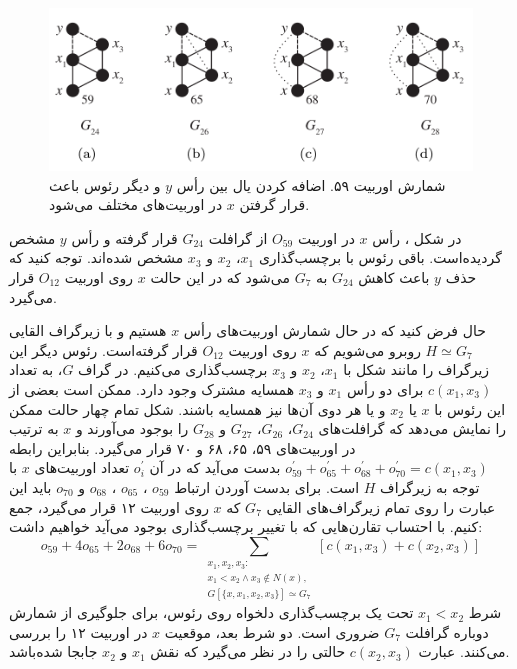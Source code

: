 \begin{figure}[t]
\centering
\includegraphics[scale=0.3]{./o59-orbit-relation.png}
\caption{شمارش اوربیت ۵۹. اضافه کردن یال بین رأس $y$ و دیگر رئوس باعث قرار گرفتن $x$ در اوربیت‌های مختلف می‌شود.}
\label{fig:o59-orbit-relation}
\end{figure}

در شکل ، رأس $x$ در اوربیت $O_{59}$ از گرافلت $G_{24}$ قرار گرفته و رأس $y$ مشخص گردیده‌است. باقی رئوس با برچسب‌گذاری $x_1$، $x_2$ و $x_3$ مشخص شده‌اند. توجه کنید که حذف $y$ باعث کاهش $G_{24}$ به $G_7$ می‌شود که در این حالت $x$ روی اوربیت $O_{12}$ قرار می‌گیرد.

حال فرض کنید که در حال شمارش اوربیت‌های رأس $x$ هستیم و با زیرگراف القایی $H \simeq G_{7}$ روبرو می‌شویم که $x$ روی اوربیت $O_{12}$ قرار گرفته‌است. رئوس دیگر این زیرگراف را مانند شکل با $x_1$، $x_2$ و $x_3$ برچسب‌گذاری می‌کنیم. در گراف $G$، به تعداد $c(x_1,x_3)$ برای دو رأس $x_1$ و $x_3$ همسایه مشترک وجود دارد. ممکن است بعضی از این رئوس با $x$ یا $x_2$ و یا هر دوی آن‌ها نیز همسایه باشند. شکل  تمام چهار حالت ممکن را نمایش می‌دهد که گرافلت‌های $G_{24}$، $G_{26}$، $G_{27}$ و $G_{28}$ را بوجود می‌آورند و $x$ به ترتیب در اوربیت‌های ۵۹، ۶۵، ۶۸ و ۷۰ قرار می‌گیرد. بنابراین رابطه $o^\prime_{59}+ o^\prime_{65}+o^\prime_{68}+o^\prime_{70} = c(x_1,x_3)$ بدست می‌آید که در آن $o^\prime_i$ تعداد اوربیت‌های $x$ با توجه به زیرگراف $H$ است. برای بدست آوردن ارتباط $o_{59}$ ،  $o_{65}$ ،  $o_{68}$ و  $o_{70}$ باید این عبارت را روی تمام زیرگراف‌های القایی $G_7$ که $x$ روی اوربیت ۱۲ قرار می‌گیرد، جمع کنیم. با احتساب تقارن‌هایی که با تغییر برچسب‌گذاری‌ بوجود می‌آید خواهیم داشت:
\begin{equation*}
o_{59}+4o_{65}+2o_{68}+6o_{70} = \sum_{\substack{x_1,x_2,x_3:\\x_1 < x_2\wedge x_3 \notin N(x),\\G[\{x,x_1,x_2,x_3\}]\simeq G_7}}{[c(x_1,x_3)+c(x_2,x_3)]}
\end{equation*}
شرط $x_1 < x_2$ تحت یک برچسب‌گذاری دلخواه روی رئوس، برای جلوگیری از شمارش دوباره گرافلت $G_7$ ضروری است. دو شرط بعد، موقعیت $x$ در اوربیت ۱۲ را بررسی می‌کنند. عبارت $c(x_2,x_3)$ حالتی را در نظر می‌گیرد که نقش $x_1$ و $x_2$ جابجا شده‌باشد.

